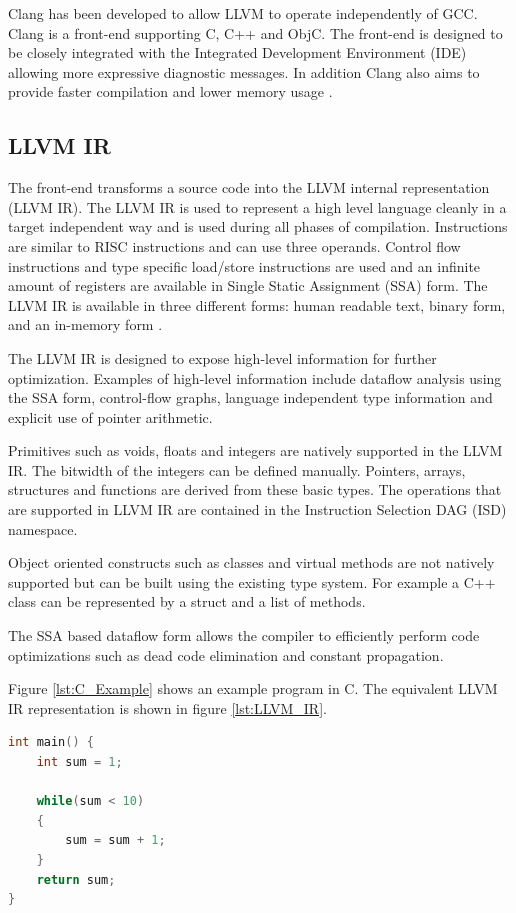 Clang has been developed to allow LLVM to operate independently of GCC. Clang is a front-end supporting C, C++ and ObjC. The front-end is designed to be closely integrated with the Integrated Development Environment (IDE) allowing more expressive diagnostic messages. In addition Clang also aims to provide faster compilation and lower memory usage \cite{clang:features}.

\subsection{LLVM IR}
The front-end transforms a source code into the LLVM internal representation (LLVM IR). The LLVM IR is used to represent a high level language cleanly in a target independent way and is used during all phases of compilation. Instructions are similar to RISC instructions and can use three operands. Control flow instructions and type specific load/store instructions are used and an infinite amount of registers are available in Single Static Assignment (SSA) form. The LLVM IR is available in three different forms: human readable text, binary form, and an in-memory form \cite{llvm:presentation}.

The LLVM IR is designed to expose high-level information for further optimization. Examples of high-level information include dataflow analysis using the SSA form, control-flow graphs, language independent type information and explicit use of pointer arithmetic. 

Primitives such as voids, floats and integers are natively supported in the LLVM IR. The bitwidth of the integers can be defined manually. Pointers, arrays, structures and functions are derived from these basic types. The operations that are supported in LLVM IR are contained in the Instruction Selection DAG (ISD) namespace.

Object oriented constructs such as classes and virtual methods are not natively supported but can be built using the existing type system. For example a C++ class can be represented by a struct and a list of methods. 

The SSA based dataflow form allows the compiler to efficiently perform code optimizations such as dead code elimination and constant propagation. 

Figure \ref{lst:C_Example} shows an example program in C. The equivalent LLVM IR representation is shown in figure \ref{lst:LLVM_IR}.

\lstset{numbers=none, captionpos=b}
\begin{lstlisting}[language=C,caption={C example program},label=lst:C_Example]
int main() {
	int sum = 1;

	while(sum < 10)
	{
		sum = sum + 1;
	}
	return sum;
}
\end{lstlisting}


